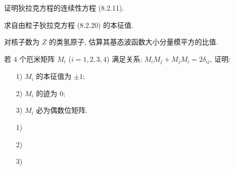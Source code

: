 \documentclass{assignment}
\begin{document}
\begin{prob}[课本习题 8.10]
    证明狄拉克方程的连续性方程 (8.2.11).
\end{prob}
\begin{pf}
    
\end{pf}

\begin{prob}[课本习题 8.11]
    求自由粒子狄拉克方程 (8.2.20) 的本征值.
\end{prob}
\begin{sol}
    
\end{sol}

\begin{prob}
    对核子数为 $Z$ 的类氢原子, 估算其基态波函数大小分量模平方的比值.
\end{prob}
\begin{sol}
    
\end{sol}

\begin{prob}
    若 $4$ 个厄米矩阵 $M_i$ ($i=1,2,3,4$) 满足关系: $M_iM_j+M_jM_i=2\delta_{ij}$, 证明:
    \begin{itemize}
        \item[1)] $M_i$ 的本征值为 $\pm 1$;
        \item[2)] $M_i$ 的迹为 $0$;
        \item[3)] $M_i$ 必为偶数位矩阵.
    \end{itemize}
\end{prob}
\begin{pf}
    \begin{itemize}
        \item[1)] 
        \item[2)] 
        \item[3)] 
    \end{itemize}
\end{pf}
\end{document}
